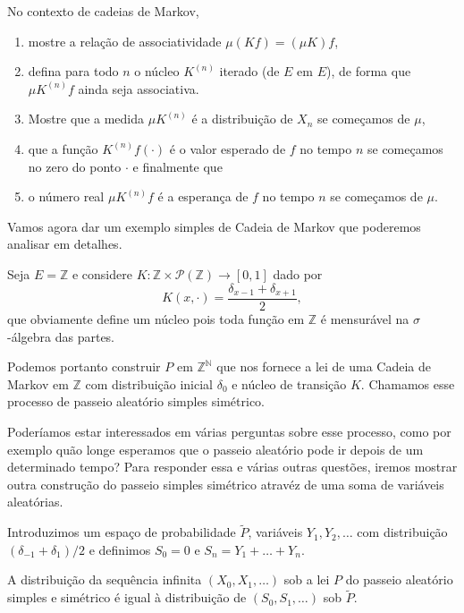 \begin{topics}
\begin{exercise}
  No contexto de cadeias de Markov,
  \begin{enumerate}[\quad a)]
  \item mostre a relação de associatividade $\mu (K f) = (\mu K) f$,
  \item defina para todo $n$ o núcleo $K^{(n)}$ iterado (de $E$ em $E$), de forma que $\mu K^{(n)} f$ ainda seja associativa.
  \item Mostre que a medida $\mu K^{(n)}$ é a distribuição de $X_n$ se começamos de $\mu$,
  \item que a função $K^{(n)} f (\cdot)$ é o valor esperado de $f$ no tempo $n$ se começamos no zero do ponto $\cdot$ e finalmente que
  \item o número real $\mu K^{(n)} f$ é a esperança de $f$ no tempo $n$ se começamos de $\mu$.
  \end{enumerate}
\end{exercise}

Vamos agora dar um exemplo simples de Cadeia de Markov que poderemos analisar em detalhes.

Seja $E = \mathbb{Z}$ e considere $K: \mathbb{Z} \times \mathcal{P}(\mathbb{Z}) \to [0,1]$ dado por
\begin{equation}
  K(x, \cdot) = \frac{\delta_{x-1} + \delta_{x+1}}{2},
\end{equation}
que obviamente define um núcleo pois toda função em $\mathbb{Z}$ é mensurável na $\sigma$-álgebra das partes.

Podemos portanto construir $P$ em $\mathbb{Z}^{\mathbb{N}}$ que nos fornece a lei de uma Cadeia de Markov em $\mathbb{Z}$ com distribuição inicial $\delta_0$ e núcleo de transição $K$.
Chamamos esse processo de passeio aleatório simples simétrico. 

Poderíamos estar interessados em várias perguntas sobre esse processo, como por exemplo quão longe esperamos que o passeio aleatório pode ir depois de um determinado tempo?
Para responder essa e várias outras questões, iremos mostrar outra construção do passeio simples simétrico atravéz de uma soma de variáveis aleatórias.

Introduzimos um espaço de probabilidade $\tilde P$, variáveis $Y_1, Y_2, \dots$ \iid com distribuição $(\delta_{-1} + \delta_{1})/2$ e definimos $S_0 = 0$ e $S_n = Y_1 + \dots + Y_n$.

\begin{lemma}
  A distribuição da sequência infinita $(X_0, X_1, \dots)$ sob a lei $P$ do passeio aleatório simples e simétrico é igual à distribuição de $(S_0, S_1, \dots)$ sob $\tilde P$.
\end{lemma}


\end{topics}
